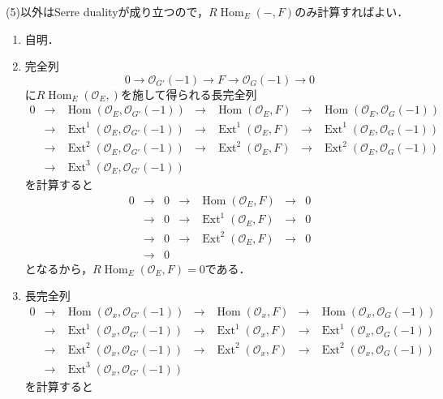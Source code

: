 \documentclass[uplatex,a4paper,11pt,dvipdfmx]{jsarticle}
\makeatletter
\theoremstyle{mystyle} %
\renewenvironment{proof}[1][\proofname]{\par
 \pushQED{\qed}%
 \normalfont \topsep6\p@\@plus6\p@\relax
 \trivlist
 \item[\hskip\labelsep
 \itshape
 {\bf\underline{#1}}]\ignorespaces
}{%
 \popQED\endtrivlist\@endpefalse
}
\DeclareMathOperator{\Hom}{Hom}
\DeclareMathOperator{\Ext}{Ext}
\makeatother
\begin{document}
\begin{proof}
	(5)以外はSerre dualityが成り立つので，$R\Hom_E(-, F)$のみ計算すればよい．
	\begin {enumerate}
	\item 自明．
	\item 完全列$$0 \to \mathcal{O}_{G'}(-1) \to F \to \mathcal{O}_G(-1) \to 0$$に$R\Hom_E(\mathcal{O}_E, )$を施して得られる長完全列\[
		\begin{array}{ccccccc}
			0 & \to & \Hom(\mathcal{O}_E, \mathcal{O}_{G'}(-1))    & \to & \Hom(\mathcal{O}_E, F)   & \to & \Hom(\mathcal{O}_E, \mathcal{O}_G(-1))   \\
			  & \to & \Ext^1(\mathcal{O}_E, \mathcal{O}_{G'}(-1))  & \to & \Ext^1(\mathcal{O}_E, F) & \to & \Ext^1(\mathcal{O}_E, \mathcal{O}_G(-1)) \\
			  & \to & \Ext^2(\mathcal{O}_E, \mathcal{O}_{G'}(-1))  & \to & \Ext^2(\mathcal{O}_E,F)  & \to & \Ext^2(\mathcal{O}_E, \mathcal{O}_G(-1)) \\
			  & \to & \Ext^3(\mathcal{O}_E, \mathcal{O}_{G'}(-1) ) &     &                          &     &
		\end{array}
	\]を計算すると\[
		\begin{array}{ccccccc}
			0 & \to & 0 & \to & \Hom(\mathcal{O}_E, F)   & \to & 0 \\
			  & \to & 0 & \to & \Ext^1(\mathcal{O}_E, F) & \to & 0 \\
			  & \to & 0 & \to & \Ext^2(\mathcal{O}_E,F)  & \to & 0 \\
			  & \to & 0 &     &                          &     &
		\end{array}
	\]となるから，$R\Hom_E(\mathcal{O}_E, F) = 0$である．
	\item 長完全列\[
		\begin{array}{ccccccc}
			0 & \to & \Hom(\mathcal{O}_x, \mathcal{O}_{G'}(-1))    & \to & \Hom(\mathcal{O}_x, F)   & \to & \Hom(\mathcal{O}_x, \mathcal{O}_G(-1))   \\
			  & \to & \Ext^1(\mathcal{O}_x, \mathcal{O}_{G'}(-1))  & \to & \Ext^1(\mathcal{O}_x, F) & \to & \Ext^1(\mathcal{O}_x, \mathcal{O}_G(-1)) \\
			  & \to & \Ext^2(\mathcal{O}_x, \mathcal{O}_{G'}(-1))  & \to & \Ext^2(\mathcal{O}_x,F)  & \to & \Ext^2(\mathcal{O}_x, \mathcal{O}_G(-1)) \\
			  & \to & \Ext^3(\mathcal{O}_x, \mathcal{O}_{G'}(-1) ) &     &                          &     &
		\end{array}
	\]を計算すると\[
		\begin{array}{ccccccc}

\end{array}\]
\end{enumerate}
\end{proof}
\end{document}
